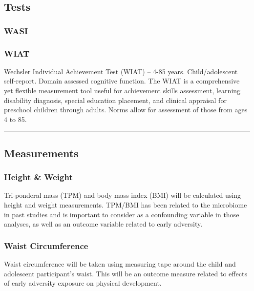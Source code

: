 \documentclass[]{book}
\begin{document}
\hypertarget{tests}{%
\subsection{Tests}\label{tests}}

\hypertarget{wasi}{%
\subsubsection{WASI}\label{wasi}}

\hypertarget{wiat}{%
\subsubsection{WIAT}\label{wiat}}

Wechsler Individual Achievement Test (WIAT) -- 4-85 years. Child/adolescent self-report. Domain assessed cognitive function. The WIAT is a comprehensive yet flexible measurement tool useful for achievement skills assessment, learning disability diagnosis, special education placement, and clinical appraisal for preschool children through adults. Norms allow for assessment of those from ages 4 to 85.

\begin{center}\rule{0.5\linewidth}{0.5pt}\end{center}

\hypertarget{measurements}{%
\subsection{Measurements}\label{measurements}}

\hypertarget{height-weight}{%
\subsubsection{Height \& Weight}\label{height-weight}}

Tri-ponderal mass (TPM) and body mass index (BMI) will be calculated using height and weight measurements. TPM/BMI has been related to the microbiome in past studies and is important to consider as a confounding variable in those analyses, as well as an outcome variable related to early adversity.

\hypertarget{waist-circumference}{%
\subsubsection{Waist Circumference}\label{waist-circumference}}

Waist circumference will be taken using measuring tape around the child and adolescent participant's waist. This will be an outcome measure related to effects of early adversity exposure on physical development.
\end{document}

